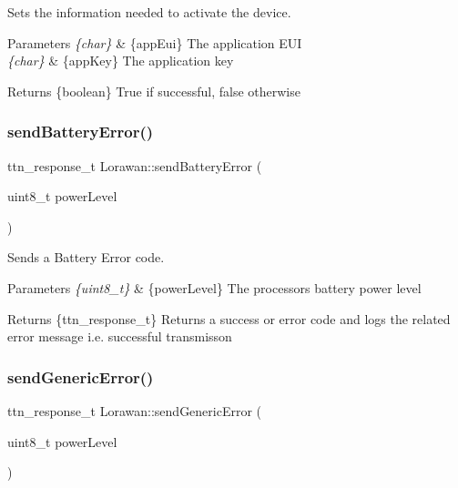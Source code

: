 Sets the information needed to activate the device. 
\begin{DoxyParams}{Parameters}
{\em \{char\}} & \{app\+Eui\} The application E\+UI \\
\hline
{\em \{char\}} & \{app\+Key\} The application key \\
\hline
\end{DoxyParams}
\begin{DoxyReturn}{Returns}
\{boolean\} True if successful, false otherwise 
\end{DoxyReturn}
\mbox{\label{class_lorawan_acf1ef0ac8ce453bccc0d08347af071f0}} 
\subsubsection{\texorpdfstring{send\+Battery\+Error()}{sendBatteryError()}}
{\footnotesize\ttfamily ttn\+\_\+response\+\_\+t Lorawan\+::send\+Battery\+Error (\begin{DoxyParamCaption}\item[{uint8\+\_\+t}]{power\+Level }\end{DoxyParamCaption})}

Sends a Battery Error code. 
\begin{DoxyParams}{Parameters}
{\em \{uint8\+\_\+t\}} & \{power\+Level\} The processor\textquotesingle{}s battery power level \\
\hline
\end{DoxyParams}
\begin{DoxyReturn}{Returns}
\{ttn\+\_\+response\+\_\+t\} Returns a success or error code and logs the related error message i.\+e. \textquotesingle{}successful transmisson\textquotesingle{} 
\end{DoxyReturn}
\mbox{\label{class_lorawan_acf1283d8a62ea919fec60a3634944576}} 
\subsubsection{\texorpdfstring{send\+Generic\+Error()}{sendGenericError()}}
{\footnotesize\ttfamily ttn\+\_\+response\+\_\+t Lorawan\+::send\+Generic\+Error (\begin{DoxyParamCaption}\item[{uint8\+\_\+t}]{power\+Level }\end{DoxyParamCaption})}

